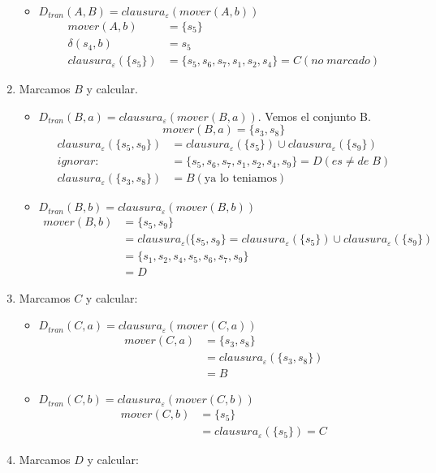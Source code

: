 \begin{enumerate}
\begin{itemize}
	\item $D_{tran}(A,B)=clausura_\varepsilon(mover(A,b))$
	\begin{align*}
mover(A,b)&=\{s_5\}	\\
\delta(s_4,b)	&=s_5	\\
clausura_\varepsilon(\{s_5\})&=\{s_5,s_6,s_7,s_1,s_2,s_4\}=C (no\; marcado)
	\end{align*}
	\end{itemize}
\item Marcamos $B$ y calcular.
	\begin{itemize}
	\item $D_{tran}(B,a)=clausura_\varepsilon(mover(B,a))$. Vemos el conjunto B.
	$$mover(B,a)=\{s_3,s_8\}$$
	\begin{align*}
	clausura_\varepsilon(\{s_5,s_9\})&=clausura_\varepsilon(\{s_5\})\cup clausura_\varepsilon(\{s_9\})	\\
	ignorar:	&=\{s_5,s_6,s_7,s_1,s_2,s_4,s_9\}=D (es \not= de\; B)\\
	clausura_\varepsilon(\{s_3,s_8\})	&=B(\mbox{ya lo teniamos})
	\end{align*}
	\item $D_{tran}(B,b)=clausura_\varepsilon(mover(B,b))$
	\begin{align*}
	mover(B,b)	&=\{s_5,s_9\}	\\
			&=clausura_\varepsilon(\{s_5,s_9\}=clausura_\varepsilon(\{s_5\})\cup clausura_\varepsilon(\{s_9\})	\\
			&=\{s_1,s_2,s_4,s_5,s_6,s_7,s_9\}	\\
			&=D
	\end{align*}
	\end{itemize}
\item Marcamos $C$ y calcular:
	\begin{itemize}
	\item $D_{tran}(C,a)=clausura_\varepsilon(mover(C,a))$
	\begin{align*}
	mover(C,a)	&=\{s_3,s_8\}	\\
				&=clausura_\varepsilon(\{s_3,s_8\})	\\
				&=B
	\end{align*}
	\item $D_{tran}(C,b)=clausura_\varepsilon(mover(C,b))$
	\begin{align*}
	mover(C,b)	&=\{s_5\}	\\
				&=clausura_\varepsilon(\{s_5\})=C
	\end{align*}
	\end{itemize}
\item Marcamos $D$ y calcular:

\end{enumerate}
